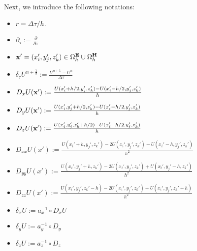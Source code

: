 \documentclass[12pt,reqno]{amsart}
\newcommand{\e}{{\bf E}}
\newcommand{\h}{{\bf H}}
\theoremstyle{definition}
\numberwithin{equation}{section}
\def\Gwh{\Omega_h}
\begin{document}
   
   Next, we introduce the following notations:
	\begin{itemize}
		\item $r=\Delta \tau/h$.\\[1mm]
		\item  $\partial_{\tau}:=\frac{\partial}{\partial \tau}$\\[1mm]
		\item ${\bf x'}=(x_i',y_j',z_k')\in \Gwh^\e\cup\Gwh^\h$\\[1mm]
		\item $\delta_{\tau} U^{n+\frac{1}{2}}:=\frac{U^{n+1}-U^{n}}{\Delta \tau}$\\[1mm]
				\item $D_x U({\bf x'}):=\frac{U(x_i'+h/2,y_j',z_k')-U(x_i'-h/2,y_j',z_k')}{h}$\\[1mm]
	\item $D_y U({\bf x'}):=\frac{U(x_i',y_j'+h/2,z_k')-U(x_i'-h/2,y_j',z_k')}{h}$\\[1mm]
		\item $D_z U({\bf x'}):=\frac{U(x_i',y_j',z_k'+h/2)-U(x_i'-h/2,y_j',z_k')}{h}$\\[1mm]
		\item $D_{xx}U(x'):=\frac{U(x_i'+h,y_j',z_k')-2U(x_i',y_j',z_k')+U(x_i'-h,y_j',z_k')}{h^2}$\\[1mm]
				\item $D_{yy}U(x'):=\frac{U(x_i',y_j'+h,z_k')-2U(x_i',y_j',z_k')+U(x_i',y_j'-h,z_k')}{h^2}$\\[1mm]
						\item $D_{zz}U(x'):=\frac{U(x_i',y_j',z_k'-h)-2U(x_i',y_j',z_k')+U(x_i',y_j',z_k'+h)}{h^2}$\\[1mm]
		\item $\delta_x U:=a_x^{-1}\circ D_xU$\\[1mm]
		\item $\delta_y U:=a_y^{-1}\circ D_y$\\[1mm]
		\item 	$\delta_z U:=a_z^{-1}\circ D_z$\\[1mm]
	\end{itemize}
\end{document}
